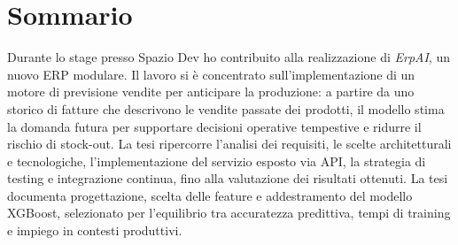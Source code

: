 \cleardoublepage
{}
{}
\begingroup
\let\clearpage\relax
\let\cleardoublepage\relax
\chapter*{Sommario}

Durante lo stage presso Spazio Dev ho contribuito alla realizzazione di \textit{ErpAI}, un nuovo ERP modulare. Il lavoro si è concentrato sull’implementazione di un motore di previsione vendite per anticipare la produzione: a partire da uno storico di fatture che descrivono le vendite passate dei prodotti, il modello stima la domanda futura per supportare decisioni operative tempestive e ridurre il rischio di stock-out. La tesi ripercorre l’analisi dei requisiti, le scelte architetturali e tecnologiche, l’implementazione del servizio esposto via API, la strategia di testing e integrazione continua, fino alla valutazione dei risultati ottenuti. La tesi documenta progettazione, scelta delle feature e addestramento del modello XGBoost, selezionato per l’equilibrio tra accuratezza predittiva, tempi di training e impiego in contesti produttivi.

\endgroup
\vfill
